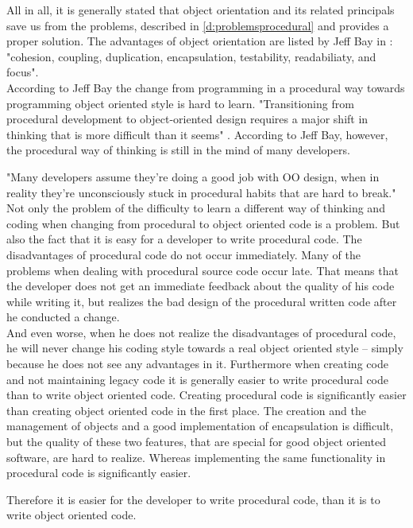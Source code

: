 All in all, it is generally stated that object orientation and its related principals save us from the problems, described in \ref{d:problemsprocedural} and provides a proper solution. The advantages of object orientation are listed by Jeff Bay in \cite[p. 70]{oc2008}: "cohesion, coupling, duplication, encapsulation, testability, readabiliaty, and focus".
\\

According to Jeff Bay the change from programming in a procedural way towards programming object oriented style is hard to learn. "Transitioning from procedural development to object-oriented design requires a major shift in thinking that is more difficult than it seems" \cite[p. 70]{bay2008}. 
According to Jeff Bay, however, the procedural way of thinking is still in the mind of many developers.

"Many developers assume they’re doing a good job with OO design, when in reality they’re unconsciously
stuck in procedural habits that are hard to break." \cite[p. 70]{bay2008} Not only the problem of the difficulty to learn a different way of thinking and coding when changing from procedural to object oriented code is a problem. But also the fact that it is easy for a developer to write procedural code. The disadvantages of procedural code do not occur immediately. Many of the problems when dealing with procedural source code occur late. That means that the developer does not get an immediate feedback about the quality of his code while writing it, but realizes the bad design of the procedural written code after he conducted a change. 
\\

And even worse, when he does not realize the disadvantages of procedural code, he will never change his coding style towards a real object oriented style -- simply because he does not see any advantages in it. Furthermore when creating code and not maintaining legacy code it is generally easier to write procedural code than to write object oriented code. Creating procedural code is significantly easier than creating object oriented code in the first place. The creation and the management of objects and a good implementation of encapsulation is difficult, but the quality of these two features, that are special for good object oriented software, are hard to realize. Whereas implementing the same functionality in procedural code is significantly easier.

Therefore it is easier for the developer to write procedural code, than it is to write object oriented code. 
\\

